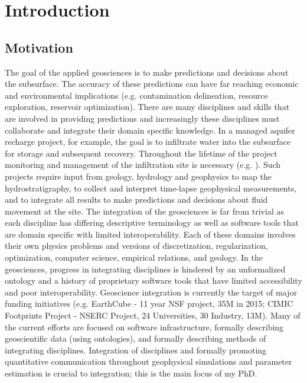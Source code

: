 \documentclass[11pt]{article}
\author{Rowan Cockett, Supervisor:  Eldad Haber}
\begin{document}


\newpage
\tableofcontents
\newpage

\section{Introduction}
\label{sec:intro}

\subsection{Motivation}

The goal of the applied geosciences is to make predictions and decisions about the subsurface. The accuracy of these predictions can have far reaching economic and environmental implications (e.g. contamination delineation, resource exploration, reservoir optimization). There are many disciplines and skills that are involved in providing predictions and increasingly these disciplines must collaborate and integrate their domain specific knowledge.
In a managed aquifer recharge project, for example, the goal is to infiltrate water into the subsurface for storage and subsequent recovery. Throughout the lifetime of the project monitoring and management of the infiltration site is necessary (e.g. \cite{Racz2011,Daily1992,Park1998}). Such projects require input from geology, hydrology and geophysics to map the hydrostratigraphy, to collect and interpret time-lapse geophysical measurements, and to integrate all results to make predictions and decisions about fluid movement at the site.
The integration of the geosciences is far from trivial as each discipline has differing descriptive terminology as well as software tools that are domain specific with limited interoperability. Each of these domains involves their own physics problems and versions of discretization, regularization, optimization, computer science, empirical relations, and geology. In the geosciences, progress in integrating disciplines is hindered by an unformalized ontology and a history of proprietary software tools that have limited accessibility and poor interoperability. Geoscience integration is currently the target of major funding initiatives (e.g. EarthCube - 11 year NSF project, 35M in 2015; CIMIC Footprints Project - NSERC Project, 24 Universities, 30 Industry, 13M). Many of the current efforts are focused on software infrastructure, formally describing geoscientific data (using ontologies), and formally describing methods of integrating disciplines. Integration of disciplines and formally promoting quantitative communication throughout geophysical simulations and parameter estimation is crucial to integration; this is the main focus of my PhD.
\end{document}
